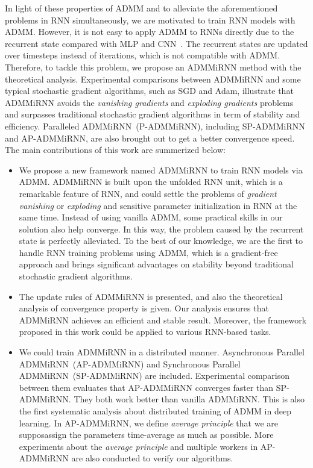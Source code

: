 \documentclass[twoside]{article}
\begin{document}
\begin{multicols}{2}
In light of these properties of ADMM and to alleviate the aforementioned problems in RNN simultaneously, we are motivated to train RNN models with ADMM. However, it is not easy to apply ADMM to RNNs directly due to the recurrent state compared with MLP and CNN~\cite{krizhevsky2012imagenet}. 
The recurrent states are updated over timesteps instead of iterations, which is not compatible with ADMM.
Therefore, to tackle this problem, we propose an ADMMiRNN method with the theoretical analysis. 
Experimental comparisons between ADMMiRNN and some typical stochastic gradient algorithms, such as SGD and Adam, illustrate that ADMMiRNN avoids the \textit{vanishing gradients} and \textit{exploding gradients} problems and surpasses traditional stochastic gradient algorithms in term of stability and efficiency. 
Paralleled ADMMiRNN~(P-ADMMiRNN), including SP-ADMMiRNN and AP-ADMMiRNN, are also brought out to get a better convergence speed. 
The main contributions of this work are summerized below:
\begin{itemize}
\item We propose a new framework named ADMMiRNN to  train RNN models via ADMM.
ADMMiRNN is built upon the unfolded RNN unit, which is a remarkable feature of RNN, and could settle the problems of \textit{gradient vanishing} or \textit{exploding} and sensitive parameter initialization in RNN at the same time. Instead of using vanilla ADMM, some practical skills in our solution also help converge. In this way, the problem caused by the recurrent state is perfectly alleviated. 
To the best of our knowledge, we are the first to handle RNN training problems using ADMM, which is a gradient-free approach and brings significant advantages on stability beyond traditional stochastic gradient algorithms.
\item The update rules of ADMMiRNN is presented, and also the theoretical analysis of convergence property is given. Our analysis ensures that ADMMiRNN achieves an efficient and stable result. Moreover, the framework proposed in this work could be applied to various RNN-based tasks.
\item We could train ADMMiRNN in a  distributed manner. Asynchronous Parallel ADMMiRNN~(AP-ADMMiRNN) and Synchronous Parallel ADMMiRNN~(SP-ADMMiRNN) are included. Experimental comparison between them evaluates that AP-ADMMiRNN converges faster than SP-ADMMiRNN. They both work better than vanilla ADMMiRNN. This is also the first systematic analysis about distributed training of ADMM in deep learning. In AP-ADMMiRNN, we define \textit{average principle} that we are supposassign the parameters time-average as much as possible. More experiments about the \textit{average principle} and multiple workers in AP-ADMMiRNN are also conducted to verify our algorithms.

\end{itemize}
\end{multicols}
\end{document}
